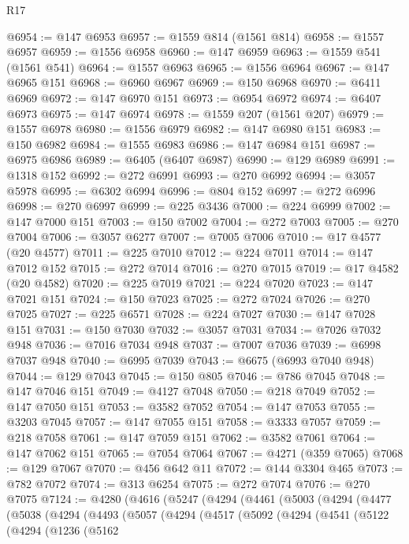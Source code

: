 \begin{lexlean}{R17}
\begin{coremodule}
@6954 := @147 @6953
@6957 := @1559 @814 (@1561 @814)
@6958 := @1557 @6957
@6959 := @1556 @6958
@6960 := @147 @6959
@6963 := @1559 @541 (@1561 @541)
@6964 := @1557 @6963
@6965 := @1556 @6964
@6967 := @147 @6965 @151
@6968 := @6960 @6967
@6969 := @150 @6968
@6970 := @6411 @6969
@6972 := @147 @6970 @151
@6973 := @6954 @6972
@6974 := @6407 @6973
@6975 := @147 @6974
@6978 := @1559 @207 (@1561 @207)
@6979 := @1557 @6978
@6980 := @1556 @6979
@6982 := @147 @6980 @151
@6983 := @150 @6982
@6984 := @1555 @6983
@6986 := @147 @6984 @151
@6987 := @6975 @6986
@6989 := @6405 (@6407 @6987)
@6990 := @129 @6989
@6991 := @1318 @152
@6992 := @272 @6991
@6993 := @270 @6992
@6994 := @3057 @5978
@6995 := @6302 @6994
@6996 := @804 @152
@6997 := @272 @6996
@6998 := @270 @6997
@6999 := @225 @3436
@7000 := @224 @6999
@7002 := @147 @7000 @151
@7003 := @150 @7002
@7004 := @272 @7003
@7005 := @270 @7004
@7006 := @3057 @6277
@7007 := @7005 @7006
@7010 := @17 @4577 (@20 @4577)
@7011 := @225 @7010
@7012 := @224 @7011
@7014 := @147 @7012 @152
@7015 := @272 @7014
@7016 := @270 @7015
@7019 := @17 @4582 (@20 @4582)
@7020 := @225 @7019
@7021 := @224 @7020
@7023 := @147 @7021 @151
@7024 := @150 @7023
@7025 := @272 @7024
@7026 := @270 @7025
@7027 := @225 @6571
@7028 := @224 @7027
@7030 := @147 @7028 @151
@7031 := @150 @7030
@7032 := @3057 @7031
@7034 := @7026 @7032 @948
@7036 := @7016 @7034 @948
@7037 := @7007 @7036
@7039 := @6998 @7037 @948
@7040 := @6995 @7039
@7043 := @6675 (@6993 @7040 @948)
@7044 := @129 @7043
@7045 := @150 @805
@7046 := @786 @7045
@7048 := @147 @7046 @151
@7049 := @4127 @7048
@7050 := @218 @7049
@7052 := @147 @7050 @151
@7053 := @3582 @7052
@7054 := @147 @7053
@7055 := @3203 @7045
@7057 := @147 @7055 @151
@7058 := @3333 @7057
@7059 := @218 @7058
@7061 := @147 @7059 @151
@7062 := @3582 @7061
@7064 := @147 @7062 @151
@7065 := @7054 @7064
@7067 := @4271 (@359 @7065)
@7068 := @129 @7067
@7070 := @456 @642 @11
@7072 := @144 @3304 @465
@7073 := @782 @7072
@7074 := @313 @6254
@7075 := @272 @7074
@7076 := @270 @7075
@7124 := @4280
    (@4616
      (@5247
        (@4294
          (@4461
            (@5003
              (@4294
                (@4477
                  (@5038
                    (@4294
                      (@4493
                        (@5057
                          (@4294
                            (@4517
                              (@5092
                                (@4294
                                  (@4541
                                    (@5122
                                      (@4294
                                        (@1236
                                          (@5162

\end{coremodule}
\end{lexlean}
